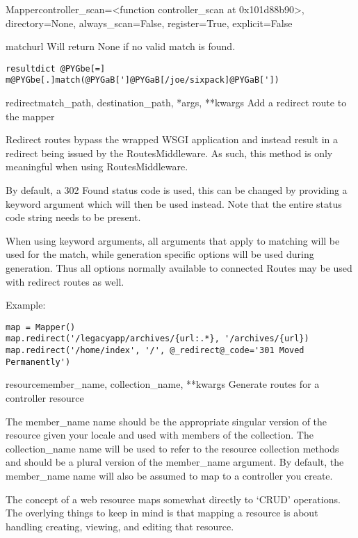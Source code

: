 \documentclass[letterpaper,10pt,english]{manual}
\begin{document}
\begin{classdesc}{Mapper}{controller\_scan=\textless{}function controller\_scan at 0x101d88b90\textgreater{}, directory=None, always\_scan=False, register=True, explicit=False}
\begin{methoddesc}{match}{url}
Will return None if no valid match is found.

\begin{Verbatim}[commandchars=@\[\]]
resultdict @PYGbe[=] m@PYGbe[.]match(@PYGaB[']@PYGaB[/joe/sixpack]@PYGaB['])
\end{Verbatim}
\end{methoddesc}

\hypertarget{routes.Mapper.redirect}{}\begin{methoddesc}{redirect}{match\_path, destination\_path, *args, **kwargs}
Add a redirect route to the mapper

Redirect routes bypass the wrapped WSGI application and instead
result in a redirect being issued by the RoutesMiddleware. As
such, this method is only meaningful when using
RoutesMiddleware.

By default, a 302 Found status code is used, this can be
changed by providing a  keyword argument
which will then be used instead. Note that the entire status
code string needs to be present.

When using keyword arguments, all arguments that apply to
matching will be used for the match, while generation specific
options will be used during generation. Thus all options
normally available to connected Routes may be used with
redirect routes as well.

Example:

\begin{Verbatim}[commandchars=@\[\]]
map = Mapper()
map.redirect('/legacyapp/archives/{url:.*}, '/archives/{url})
map.redirect('/home/index', '/', @_redirect@_code='301 Moved Permanently')
\end{Verbatim}
\end{methoddesc}

\hypertarget{routes.Mapper.resource}{}\begin{methoddesc}{resource}{member\_name, collection\_name, **kwargs}
Generate routes for a controller resource

The member\_name name should be the appropriate singular version
of the resource given your locale and used with members of the
collection. The collection\_name name will be used to refer to
the resource collection methods and should be a plural version
of the member\_name argument. By default, the member\_name name
will also be assumed to map to a controller you create.

The concept of a web resource maps somewhat directly to `CRUD' 
operations. The overlying things to keep in mind is that
mapping a resource is about handling creating, viewing, and
editing that resource.


\end{methoddesc}
\end{classdesc}
\end{document}
